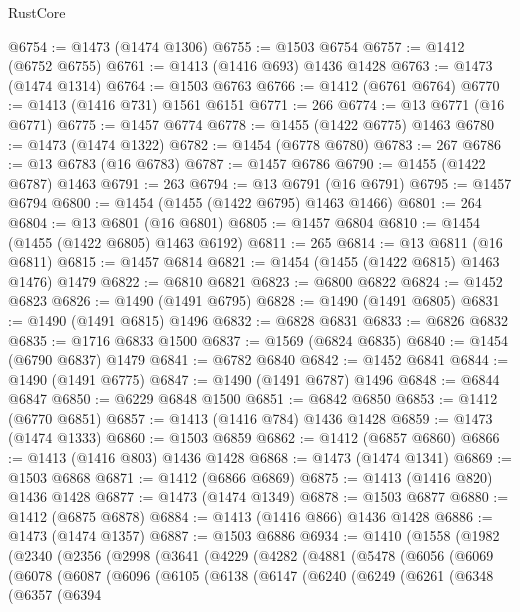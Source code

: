 \begin{lexlean}{RustCore}
\begin{coremodule}
@6754 := @1473 (@1474 @1306)
@6755 := @1503 @6754
@6757 := @1412 (@6752 @6755)
@6761 := @1413 (@1416 @693) @1436 @1428
@6763 := @1473 (@1474 @1314)
@6764 := @1503 @6763
@6766 := @1412 (@6761 @6764)
@6770 := @1413 (@1416 @731) @1561 @6151
@6771 := 266
@6774 := @13 @6771 (@16 @6771)
@6775 := @1457 @6774
@6778 := @1455 (@1422 @6775) @1463
@6780 := @1473 (@1474 @1322)
@6782 := @1454 (@6778 @6780)
@6783 := 267
@6786 := @13 @6783 (@16 @6783)
@6787 := @1457 @6786
@6790 := @1455 (@1422 @6787) @1463
@6791 := 263
@6794 := @13 @6791 (@16 @6791)
@6795 := @1457 @6794
@6800 := @1454 (@1455 (@1422 @6795) @1463 @1466)
@6801 := 264
@6804 := @13 @6801 (@16 @6801)
@6805 := @1457 @6804
@6810 := @1454 (@1455 (@1422 @6805) @1463 @6192)
@6811 := 265
@6814 := @13 @6811 (@16 @6811)
@6815 := @1457 @6814
@6821 := @1454 (@1455 (@1422 @6815) @1463 @1476) @1479
@6822 := @6810 @6821
@6823 := @6800 @6822
@6824 := @1452 @6823
@6826 := @1490 (@1491 @6795)
@6828 := @1490 (@1491 @6805)
@6831 := @1490 (@1491 @6815) @1496
@6832 := @6828 @6831
@6833 := @6826 @6832
@6835 := @1716 @6833 @1500
@6837 := @1569 (@6824 @6835)
@6840 := @1454 (@6790 @6837) @1479
@6841 := @6782 @6840
@6842 := @1452 @6841
@6844 := @1490 (@1491 @6775)
@6847 := @1490 (@1491 @6787) @1496
@6848 := @6844 @6847
@6850 := @6229 @6848 @1500
@6851 := @6842 @6850
@6853 := @1412 (@6770 @6851)
@6857 := @1413 (@1416 @784) @1436 @1428
@6859 := @1473 (@1474 @1333)
@6860 := @1503 @6859
@6862 := @1412 (@6857 @6860)
@6866 := @1413 (@1416 @803) @1436 @1428
@6868 := @1473 (@1474 @1341)
@6869 := @1503 @6868
@6871 := @1412 (@6866 @6869)
@6875 := @1413 (@1416 @820) @1436 @1428
@6877 := @1473 (@1474 @1349)
@6878 := @1503 @6877
@6880 := @1412 (@6875 @6878)
@6884 := @1413 (@1416 @866) @1436 @1428
@6886 := @1473 (@1474 @1357)
@6887 := @1503 @6886
@6934 := @1410
    (@1558
      (@1982
        (@2340
          (@2356
            (@2998
              (@3641
                (@4229
                  (@4282
                    (@4881
                      (@5478
                        (@6056
                          (@6069
                            (@6078
                              (@6087
                                (@6096
                                  (@6105
                                    (@6138
                                      (@6147
                                        (@6240
                                          (@6249
                                            (@6261
                                              (@6348
                                                (@6357
                                                  (@6394

\end{coremodule}
\end{lexlean}
